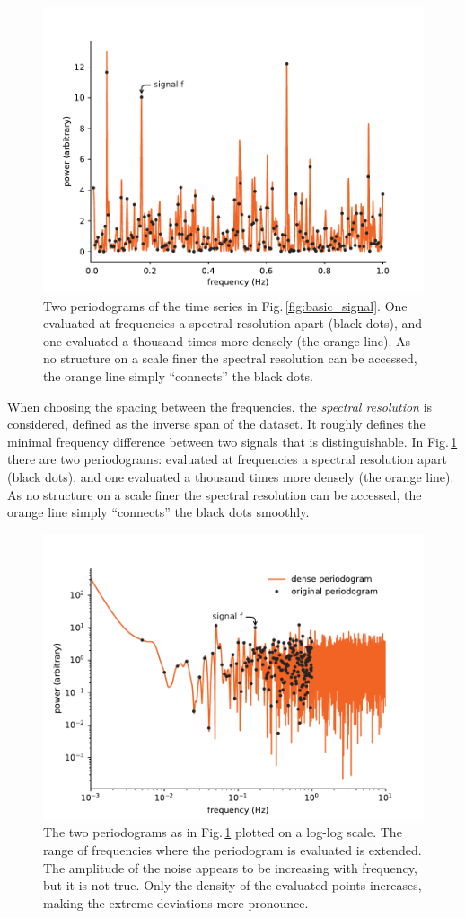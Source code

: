 \begin{figure}
  \centering \includegraphics[width=0.8\linewidth]{gfx/axions/basic_periodogram.pdf}
  \caption{Two periodograms of the time series in Fig.\,\ref{fig:basic_signal}. One evaluated at frequencies a spectral resolution apart (black dots), and one evaluated a thousand times more densely (the orange line). As no structure on a scale finer the spectral resolution can be accessed, the orange line simply ``connects'' the black dots.}\label{fig:basic_periodogram}
\end{figure}

When choosing the spacing between the frequencies, the \emph{spectral resolution} is considered, defined as the inverse span of the dataset. It roughly defines the minimal frequency difference between two signals that is distinguishable. In Fig.\,\ref{fig:basic_periodogram} there are two periodograms: evaluated at frequencies a spectral resolution apart (black dots), and one evaluated a thousand times more densely (the orange line). As no structure on a scale finer the spectral resolution can be accessed, the orange line simply ``connects'' the black dots smoothly.

\begin{figure}
  \centering \includegraphics[width=0.8\linewidth]{gfx/axions/basic_periodogram_loglog.pdf}
  \caption{The two periodograms as in Fig.\,\ref{fig:basic_periodogram} plotted on a log-log scale. The range of frequencies where the periodogram is evaluated is extended. The amplitude of the noise appears to be increasing with frequency, but it is not true. Only the density of the evaluated points increases, making the extreme deviations more pronounce.}\label{fig:basic_periodogram_loglog}
\end{figure}


